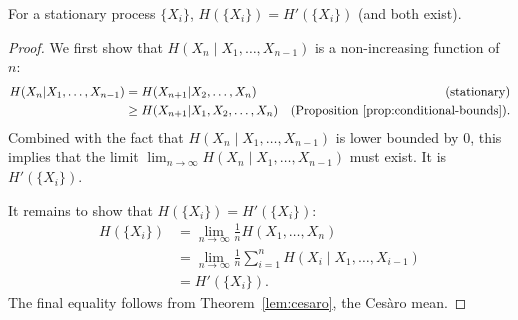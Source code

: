 \begin{theorem}
For a stationary process $\{X_i\}$, $H(\{X_i\}) = H'(\{X_i\})$ (and both exist).
\end{theorem}
\begin{proof}
We first show that $H(X_n \mid X_1, \dots, X_{n-1})$ is a non-increasing function of $n$:
\begin{align}
H(X_{n}|X_1, \dots, X_{n-1}) &= H(X_{n+1}|X_2, \dots, X_{n})\nonumber &\text{(stationary)}\\
&\geq H(X_{n+1}|X_1, X_2, \ldots, X_{n}) &\text{(Proposition~\ref{prop:conditional-bounds})}.
\end{align}
Combined with the fact that $H(X_n \mid X_1, \dots, X_{n-1})$ is lower bounded by 0, this implies that the limit $\lim_{n \to \infty} H(X_n \mid X_1, \dots, X_{n-1})$ must exist. It is $H'(\{X_i\})$.

It remains to show that $H(\{X_i\}) = H'(\{X_i\})$:
\begin{align}
H(\{X_i\}) &= \lim_{n \to \infty} \frac{1}{n} H(X_1, \dots, X_n)\nonumber\\
&= \lim_{n \to \infty} \frac{1}{n} \sum_{i=1}^n H(X_i \mid X_1, \dots, X_{i-1})\nonumber\\
&= H'(\{X_i\}).
\end{align}
The final equality follows from Theorem~\ref{lem:cesaro}, the Ces\`{a}ro mean.

\end{proof}


